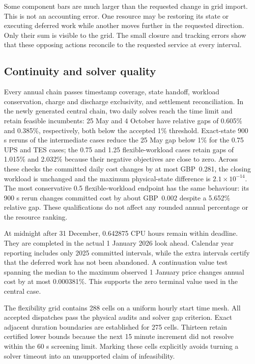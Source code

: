 Some component bars are much larger than the requested change in grid import.
This is not an accounting error. One resource may be restoring its state or
executing deferred work while another moves further in the requested direction.
Only their sum is visible to the grid. The small closure and tracking errors show
that these opposing actions reconcile to the requested service at every interval.

\subsection{Continuity and solver quality}

Every annual chain passes timestamp coverage, state handoff, workload
conservation, charge and discharge exclusivity, and settlement reconciliation.
In the newly generated central chain, two daily solves reach the time limit and
retain feasible incumbents: 25 May and 4 October have relative gaps of 0.605\%
and 0.385\%, respectively, both below the accepted 1\% threshold.
Exact-state 900 s reruns of the intermediate cases reduce the 25 May gap below
1\% for the 0.75 UPS and TES cases; the 0.75 and 1.25 flexible-workload cases
retain gaps of 1.015\% and 2.032\% because their negative objectives are close to
zero. Across these checks the committed daily cost changes by at most GBP~0.281,
the closing workload is unchanged and the maximum physical-state difference is
$2.1\times10^{-14}$. The most conservative 0.5 flexible-workload endpoint has
the same behaviour: its 900 s rerun changes committed cost by about GBP~0.002
despite a 5.652\% relative gap. These qualifications do not affect any rounded
annual percentage or the resource ranking.

At midnight after 31 December, 0.642875 CPU hours remain within deadline. They
are completed in the actual 1 January 2026 look ahead. Calendar year reporting
includes only 2025 committed intervals, while the extra intervals certify that
the deferred work has not been abandoned. A continuation value test spanning
the median to the maximum observed 1 January price changes annual cost by at
most 0.000381\%. This supports the zero terminal value used in the central case.

The flexibility grid contains 288 cells on a uniform hourly start time mesh.
All accepted dispatches pass the physical audits and solver gap criterion.
Exact adjacent duration boundaries are established for 275 cells. Thirteen retain certified
lower bounds because the next 15 minute increment did not resolve within the
60 s screening limit. Marking these cells explicitly avoids turning a solver
timeout into an unsupported claim of infeasibility.

